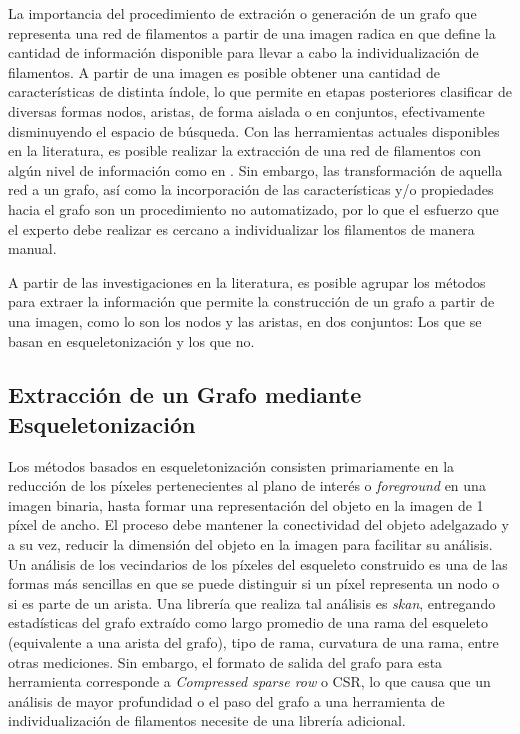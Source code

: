 La importancia del procedimiento de extraci\'on o generaci\'on de un grafo que representa una red de filamentos a partir de una imagen radica en que define la cantidad de informaci\'on disponible para llevar a cabo la individualizaci\'on de filamentos. A partir de una imagen es posible obtener una cantidad de caracter\'isticas de distinta \'indole, lo que permite en etapas posteriores clasificar de diversas formas nodos, aristas, de forma aislada o en conjuntos, efectivamente disminuyendo el espacio de b\'usqueda. Con las herramientas actuales disponibles en la literatura, es posible realizar la extracci\'on de una red de filamentos con algún nivel de informaci\'on como en \cite{xu2015soax}. Sin embargo, las transformaci\'on de aquella red a un grafo, as\'i como la incorporaci\'on de las caracter\'isticas y/o propiedades hacia el grafo son un procedimiento no automatizado, por lo que el esfuerzo que el experto debe realizar es cercano a individualizar los filamentos de manera manual.

A partir de las investigaciones en la literatura, es posible agrupar los m\'etodos para extraer la informaci\'on que permite la construcci\'on de un grafo a partir de una imagen, como lo son los nodos y las aristas, en dos conjuntos: Los que se basan en esqueletonizaci\'on\cite{lavado2018comparacion} y los que no. 

\subsection{Extracci\'on de un Grafo mediante Esqueletonizaci\'on}
\label{subsec:infoLossSkel}

Los m\'etodos basados en esqueletonizaci\'on consisten primariamente en la reducci\'on de los p\'ixeles pertenecientes al plano de inter\'es o {\it foreground} en una imagen binaria, hasta formar una representaci\'on del objeto en la imagen de 1 p\'ixel de ancho. El proceso debe mantener la conectividad del objeto adelgazado y a su vez, reducir la dimensi\'on del objeto en la imagen para facilitar su an\'alisis\cite{saha2017skeletonization}. Un an\'alisis de los vecindarios de los p\'ixeles del esqueleto construido es una de las formas m\'as sencillas en que se puede distinguir si un p\'ixel representa un nodo o si es parte de un arista. Una librer\'ia que realiza tal an\'alisis es {\it skan}\cite{nunez2018new}, entregando estad\'isticas del grafo extra\'ido como largo promedio de una rama del esqueleto (equivalente a una arista del grafo), tipo de rama, curvatura de una rama, entre otras mediciones. Sin embargo, el formato de salida del grafo para esta herramienta corresponde a {\it Compressed sparse row} o CSR, lo que causa que un an\'alisis de mayor profundidad o el paso del grafo a una herramienta de individualizaci\'on de filamentos necesite de una librer\'ia adicional. 


